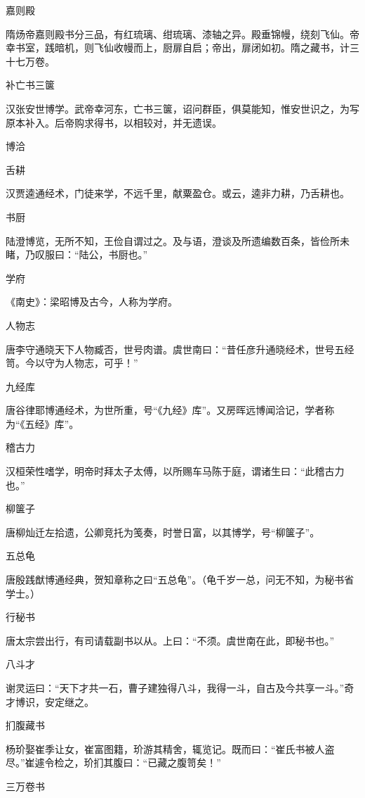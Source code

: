 \documentclass[a4paper,12pt,UTF8,twoside]{ctexbook}
\begin{document}
    嘉则殿
    
    隋炀帝嘉则殿书分三品，有红琉璃、绀琉璃、漆轴之异。殿垂锦幔，绕刻飞仙。帝幸书室，践暗机，则飞仙收幔而上，厨扉自启；帝出，扉闭如初。隋之藏书，计三十七万卷。
    
    补亡书三箧
    
    汉张安世博学。武帝幸河东，亡书三箧，诏问群臣，俱莫能知，惟安世识之，为写原本补入。后帝购求得书，以相较对，并无遗误。
    
    博洽
    
    舌耕
    
    汉贾逵通经术，门徒来学，不远千里，献粟盈仓。或云，逵非力耕，乃舌耕也。
    
    书厨
    
    陆澄博览，无所不知，王俭自谓过之。及与语，澄谈及所遗编数百条，皆俭所未睹，乃叹服曰：“陆公，书厨也。”
    
    学府
    
    《南史》：梁昭博及古今，人称为学府。
    
    人物志
    
    唐李守通晓天下人物臧否，世号肉谱。虞世南曰：“昔任彦升通晓经术，世号五经笥。今以守为人物志，可乎！”
    
    九经库
    
    唐谷律耶博通经术，为世所重，号“《九经》库”。又房晖远博闻洽记，学者称为“《五经》库”。
    
    稽古力
    
    汉桓荣性嗜学，明帝时拜太子太傅，以所赐车马陈于庭，谓诸生曰：“此稽古力也。”
    
    柳箧子
    
    唐柳灿迁左拾遗，公卿竞托为笺奏，时誉日富，以其博学，号“柳箧子”。
    
    五总龟
    
    唐殷践猷博通经典，贺知章称之曰“五总龟”。（龟千岁一总，问无不知，为秘书省学士。）
    
    行秘书
    
    唐太宗尝出行，有司请载副书以从。上曰：“不须。虞世南在此，即秘书也。”
    
    八斗才
    
    谢灵运曰：“天下才共一石，曹子建独得八斗，我得一斗，自古及今共享一斗。”奇才博识，安定继之。
    
    扪腹藏书
    
    杨玠娶崔季让女，崔富图籍，玠游其精舍，辄览记。既而曰：“崔氏书被人盗尽。”崔遽令检之，玠扪其腹曰：“已藏之腹笥矣！”
    
    三万卷书
    
\end{document}
